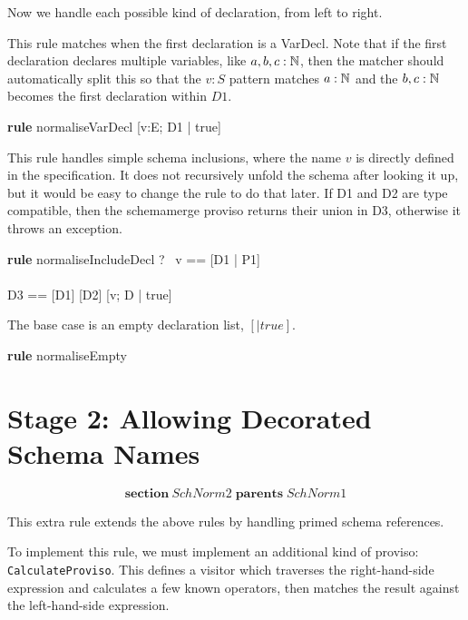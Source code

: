\documentclass{article}
\newenvironment{zsection}{\[}{\]}
\newcommand{\SECTION}{\textbf{section}~}
\newcommand{\parents}{\mathrel{\textbf{parents}}}
\newenvironment{zedrule}[1]{\par\textbf{rule }#1\vspace{-1ex}\infrule}{\endinfrule}
\newcommand{\derives}{\derive{}}
\newcommand{\proviso}{\raisebox{0.5ex}{${}_{\blacktriangleright}\ $}}%
\newcommand{\schemamerge}{\mathbin{\textbf{schemamerge}}}
\begin{document}
Now we handle each possible kind of declaration, from left to right.

This rule matches when the first declaration is a VarDecl.
Note that if the first declaration declares multiple variables,
like $a,b,c:{\mathbb N}$, then the matcher should automatically split this
so that the $v:S$ pattern matches $a:{\mathbb N}$ and the $b,c:{\mathbb N}$
becomes the first declaration within $D1$.
\begin{zedrule}{normaliseVarDecl}
   [D1 | true] \unfoldsTo [D2 | P2]
\derives
   [v:E; D1 | true] \unfoldsTo [v:E; D2 | P2]
\end{zedrule}

This rule handles simple schema inclusions, where the name
$v$ is directly defined in the specification.  It does not
recursively unfold the schema after looking it up, but it would
be easy to change the rule to do that later.  If D1 and D2 are 
type compatible, then the schemamerge proviso returns their
union in D3, otherwise it throws an exception.

\begin{zedrule}{normaliseIncludeDecl}
   \proviso ?~ v == [D1 | P1] \\
   [D | true] \unfoldsTo [D2 | P2] \\
   \proviso D3 == [D1] \schemamerge [D2]
\derives
   [v; D | true] \unfoldsTo [D3 | P1 \land P2]
\end{zedrule}

The base case is an empty declaration list, $[|true]$.
\begin{zedrule}{normaliseEmpty}
   [~ | true] \unfoldsTo [~ | true]
\end{zedrule}


\section*{Stage 2: Allowing Decorated Schema Names}

\begin{zsection}
  \SECTION SchNorm2 \parents SchNorm1
\end{zsection}

This extra rule extends the above rules by handling primed schema
references.

To implement this rule, we must implement an additional kind of
proviso: \verb!CalculateProviso!.  This defines a visitor which
traverses the right-hand-side expression and calculates a few known
operators, then matches the result against the left-hand-side expression.
\end{document}
